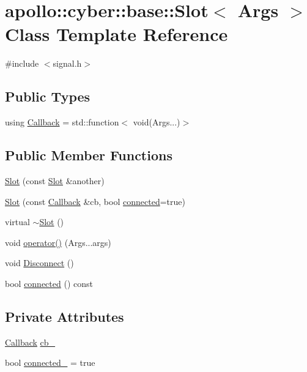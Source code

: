 \hypertarget{classapollo_1_1cyber_1_1base_1_1Slot}{\section{apollo\-:\-:cyber\-:\-:base\-:\-:Slot$<$ Args $>$ Class Template Reference}
\label{classapollo_1_1cyber_1_1base_1_1Slot}
}


{\ttfamily \#include $<$signal.\-h$>$}

\subsection*{Public Types}
\begin{DoxyCompactItemize}
\item 
using \hyperlink{classapollo_1_1cyber_1_1base_1_1Slot_a48f31ca5e36bfedb3f0e91ef69bb4fe8}{Callback} = std\-::function$<$ void(Args...)$>$
\end{DoxyCompactItemize}
\subsection*{Public Member Functions}
\begin{DoxyCompactItemize}
\item 
\hyperlink{classapollo_1_1cyber_1_1base_1_1Slot_a90a8dd917577e162d3aa31d9723c1263}{Slot} (const \hyperlink{classapollo_1_1cyber_1_1base_1_1Slot}{Slot} \&another)
\item 
\hyperlink{classapollo_1_1cyber_1_1base_1_1Slot_a2610f052421cdf0946c16940e19dbaa6}{Slot} (const \hyperlink{classapollo_1_1cyber_1_1base_1_1Slot_a48f31ca5e36bfedb3f0e91ef69bb4fe8}{Callback} \&cb, bool \hyperlink{classapollo_1_1cyber_1_1base_1_1Slot_a4efd4d508cb6baf88e758b570245b0ff}{connected}=true)
\item 
virtual \hyperlink{classapollo_1_1cyber_1_1base_1_1Slot_a8bcffc0816056a7a0faea8220e5f709a}{$\sim$\-Slot} ()
\item 
void \hyperlink{classapollo_1_1cyber_1_1base_1_1Slot_a4af2e07fa53a70252256b48129e765bb}{operator()} (Args...\-args)
\item 
void \hyperlink{classapollo_1_1cyber_1_1base_1_1Slot_a9553b329c016607def125792f1b161f2}{Disconnect} ()
\item 
bool \hyperlink{classapollo_1_1cyber_1_1base_1_1Slot_a4efd4d508cb6baf88e758b570245b0ff}{connected} () const 
\end{DoxyCompactItemize}
\subsection*{Private Attributes}
\begin{DoxyCompactItemize}
\item 
\hyperlink{classapollo_1_1cyber_1_1base_1_1Slot_a48f31ca5e36bfedb3f0e91ef69bb4fe8}{Callback} \hyperlink{classapollo_1_1cyber_1_1base_1_1Slot_aceb00aa55afab2d18b26b268aa182adc}{cb\-\_\-}
\item 
bool \hyperlink{classapollo_1_1cyber_1_1base_1_1Slot_a19055072df9557cd3085838873a4999b}{connected\-\_\-} = true
\end{DoxyCompactItemize}


